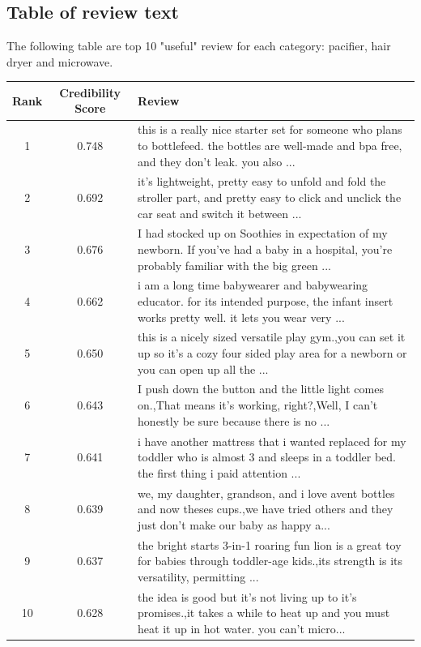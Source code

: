 \documentclass{mcmthesis}
\begin{document}
\newpage
\begin{appendices}
\section{Table of review text}
The following table are top 10 "useful" review for each category: pacifier, hair dryer and microwave.
\begin{center}
\begin{tabularx}{0.95\textwidth}{|c|c|X|}
\hline
\multicolumn{1}{|l|}{Rank} &
  \textbf{Credibility Score} &
  \textbf{Review} \\ \hline
1 & 0.748 & this is a really nice starter set for someone who plans to bottlefeed. the bottles are well-made and bpa free, and they don't leak. you also ... \\ \hline
2 &
  0.692 &
  it's lightweight, pretty easy to unfold and fold the stroller part, and pretty easy to click and unclick the car seat and switch it between ... \\ \hline
3 &
  0.676 &
  I had stocked up on Soothies in expectation of my newborn. If you've had a baby in a hospital, you're probably familiar with the big green ... \\ \hline
4 &
  0.662 &
  i am a long time babywearer and babywearing educator. for its intended purpose, the infant insert works pretty well. it lets you wear very ... \\ \hline
5 &
  0.650 &
  this is a nicely sized versatile play gym.,you can set it up so it's a cozy four sided play area for a newborn or you can open up all the ... \\ \hline
6 &
  0.643 &
  I push down the button and the little light comes on.,That means it's working, right?,Well, I can't honestly be sure because there is no ... \\ \hline
7 &
  0.641 &
  i have another mattress that i wanted replaced for my toddler who is almost 3 and sleeps in a toddler bed. the first thing i paid attention ... \\ \hline
8 &
  0.639 &
  we, my daughter, grandson, and i love avent bottles and now theses cups.,we have tried others and they just don’t make our baby as happy a... \\ \hline
9 &
  0.637 &
  the bright starts 3-in-1 roaring fun lion is a great toy for babies through toddler-age kids.,its strength is its versatility, permitting ... \\ \hline
10 &
  0.628 &
  the idea is good but it's not living up to it's promises.,it takes a while to heat up and you must heat it up in hot water. you can't micro... \\ \hline

\end{tabularx}
\end{center}
\end{appendices}
\end{document}
